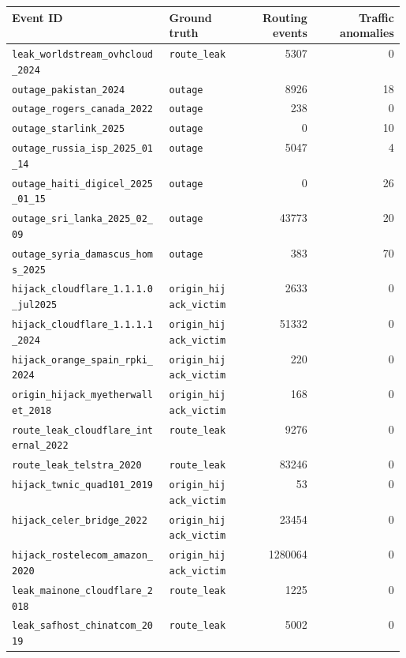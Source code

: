 \documentclass[sigcomm,nonatbib]{acmart}
\begin{document}
\begin{table}[t][h]
\centering\tiny
\setlength{\tabcolsep}{2pt}
\begin{tabular}{p{0.40\linewidth}p{0.18\linewidth}rr}
\hline
Event ID & Ground truth & Routing events & Traffic anomalies \\ \hline
\texttt{leak\_worldstream\_ovhcloud\_2024} & \texttt{route\_leak} & 5307 & 0 \\
\texttt{outage\_pakistan\_2024} & \texttt{outage} & 8926 & 18 \\
\texttt{outage\_rogers\_canada\_2022} & \texttt{outage} & 238 & 0 \\
\texttt{outage\_starlink\_2025} & \texttt{outage} & 0 & 10 \\
\texttt{outage\_russia\_isp\_2025\_01\_14} & \texttt{outage} & 5047 & 4 \\
\texttt{outage\_haiti\_digicel\_2025\_01\_15} & \texttt{outage} & 0 & 26 \\
\texttt{outage\_sri\_lanka\_2025\_02\_09} & \texttt{outage} & 43773 & 20 \\
\texttt{outage\_syria\_damascus\_homs\_2025} & \texttt{outage} & 383 & 70 \\
\texttt{hijack\_cloudflare\_1.1.1.0\_jul2025} & \texttt{origin\_hijack\_victim} & 2633 & 0 \\
\texttt{hijack\_cloudflare\_1.1.1.1\_2024} & \texttt{origin\_hijack\_victim} & 51332 & 0 \\
\texttt{hijack\_orange\_spain\_rpki\_2024} & \texttt{origin\_hijack\_victim} & 220 & 0 \\
\texttt{origin\_hijack\_myetherwallet\_2018} & \texttt{origin\_hijack\_victim} & 168 & 0 \\
\texttt{route\_leak\_cloudflare\_internal\_2022} & \texttt{route\_leak} & 9276 & 0 \\
\texttt{route\_leak\_telstra\_2020} & \texttt{route\_leak} & 83246 & 0 \\
\texttt{hijack\_twnic\_quad101\_2019} & \texttt{origin\_hijack\_victim} & 53 & 0 \\
\texttt{hijack\_celer\_bridge\_2022} & \texttt{origin\_hijack\_victim} & 23454 & 0 \\
\texttt{hijack\_rostelecom\_amazon\_2020} & \texttt{origin\_hijack\_victim} & 1280064 & 0 \\
\texttt{leak\_mainone\_cloudflare\_2018} & \texttt{route\_leak} & 1225 & 0 \\
\texttt{leak\_safhost\_chinatcom\_2019} & \texttt{route\_leak} & 5002 & 0 \\

\end{tabular}
\end{table}
\end{document}
